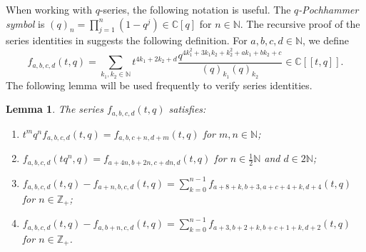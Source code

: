 \documentclass[a4paper, 12pt, reqno]{amsart}
\newtheorem{lemma}[theorem]{Lemma}
\theoremstyle{remark}
\begin{document}
When working with $q$-series, the following notation is useful.
The \emph{$q$-Pochhammer symbol} is $(q)_n = \prod_{j = 1}^n(1 - q^j) \in \mathbb{C}[q]$ for $n \in \mathbb{N}$.
The recursive proof of the series identities in \cite{andrews_singular_2022} suggests the following definition.
For $a, b, c, d \in \mathbb{N}$, we define
\begin{equation*}
  f_{a, b, c, d}(t, q) = \sum_{k_1, k_2 \in \mathbb{N}}t^{4k_1 + 2k_2 + d}\frac{q^{4k_1^2 + 3k_1k_2 + k_2^2 + ak_1 + bk_2 + c}}{(q)_{k_1}(q)_{k_2}} \in \mathbb{C}[[t, q]].
\end{equation*}
The following lemma will be used frequently to verify series identities.

\begin{lemma}
  \label{lmm:1}
  The series $f_{a, b, c, d}(t, q)$ satisfies:
  \begin{enumerate}
  \item $t^mq^nf_{a, b, c, d}(t, q) = f_{a, b, c + n, d + m}(t, q)$ for $m, n \in \mathbb{N}$;
  \item $f_{a, b, c, d}(tq^n, q) = f_{a + 4n, b + 2n, c + dn, d}(t, q)$ for $n \in \frac{1}{2}\mathbb{N}$ and $d \in 2\mathbb{N}$;
  \item $f_{a, b, c, d}(t, q) - f_{a + n, b, c, d}(t, q) = \sum_{k = 0}^{n - 1}f_{a + 8 + k, b + 3, a + c + 4 + k, d + 4}(t, q)$ for $n \in \mathbb{Z}_+$;
  \item $f_{a, b, c, d}(t, q) - f_{a, b + n, c, d}(t, q) = \sum_{k = 0}^{n - 1}f_{a + 3, b + 2 + k, b + c + 1 + k, d + 2}(t, q)$ for $n \in \mathbb{Z}_+$.
  \end{enumerate}
\end{lemma}
\end{document}
